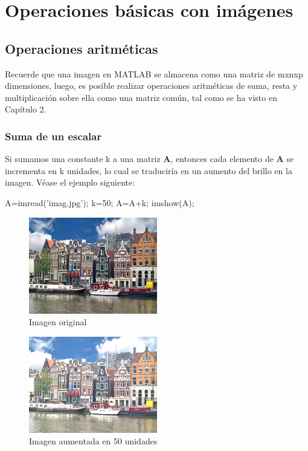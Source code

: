 \section{Operaciones básicas con imágenes}

\subsection{Operaciones aritméticas}

Recuerde que una imagen en MATLAB se almacena como una matriz de mxnxp
dimensiones, luego, es posible realizar operaciones aritméticas de suma,
resta y multiplicación sobre ella como una matriz común, tal como se ha
visto en Capítulo 2.

\subsubsection{Suma de un escalar}

Si sumamos una constante k a una matriz \textbf{A}, entonces cada
elemento de \textbf{A} se incrementa en k unidades, lo cual se
traduciría en un aumento del brillo en la imagen. Véase el ejemplo
siguiente:

\begin{matlab}
A=imread('imag.jpg');
k=50;
A=A+k;
imshow(A);
\end{matlab}

\begin{figure}[htbp]
    \centering
    \includegraphics[width=0.5\textwidth]{src/img/ch7/holland_original.png}
    \caption{Imagen original}
    \label{fig:holland_original}
\end{figure}

\begin{figure}[htbp]
    \centering
    \includegraphics[width=0.5\textwidth]{src/img/ch7/holland_mas50.png}
    \caption{Imagen aumentada en 50 unidades}
    \label{fig:holland_mas50}
\end{figure}

